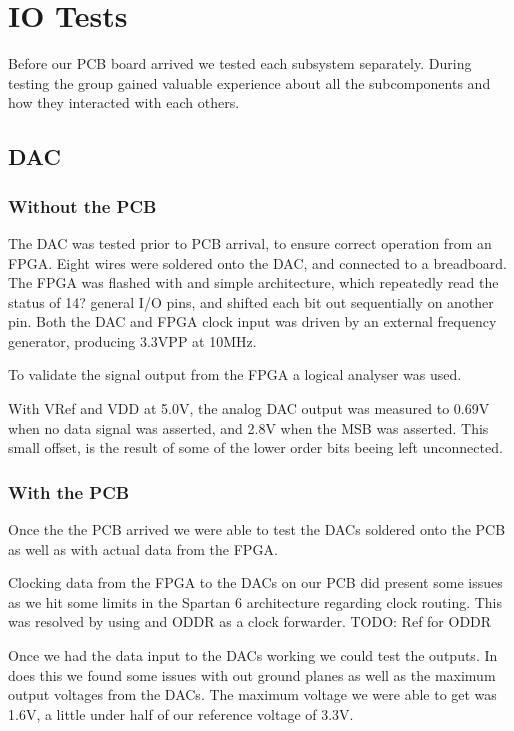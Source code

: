 \section{IO Tests}
Before our PCB board arrived we tested each subsystem separately.
During testing the group gained valuable experience about all the subcomponents and how they interacted with each others.

\subsection{DAC}

\subsubsection{Without the PCB}

The DAC was tested prior to PCB arrival, to ensure correct operation from an FPGA.
Eight wires were soldered onto the DAC, and connected to a breadboard.
The FPGA was flashed with and simple architecture, which repeatedly read the status of 14? general I/O pins, and shifted each bit out sequentially on another pin.
Both the DAC and FPGA clock input was driven by an external frequency generator, producing 3.3VPP at 10MHz.

To validate the signal output from the FPGA a logical analyser was used.

With VRef and VDD at 5.0V, the analog DAC output was measured to 0.69V when no data signal was asserted, and 2.8V when the MSB was asserted. This small offset, is the result of some of the lower order bits beeing left unconnected.

\subsubsection{With the PCB}

Once the the PCB arrived we were able to test the DACs soldered onto the PCB as well as with actual data from the FPGA.

Clocking data from the FPGA to the DACs on our PCB did present some issues as we hit some limits in the Spartan 6 architecture regarding clock routing. This was resolved by using and ODDR as a clock forwarder.
TODO: Ref for ODDR

Once we had the data input to the DACs working we could test the outputs. In does this we found some issues with out ground planes as well as the maximum output voltages from the DACs. The maximum voltage we were able to get was 1.6V, a little under half of our reference voltage of 3.3V.


